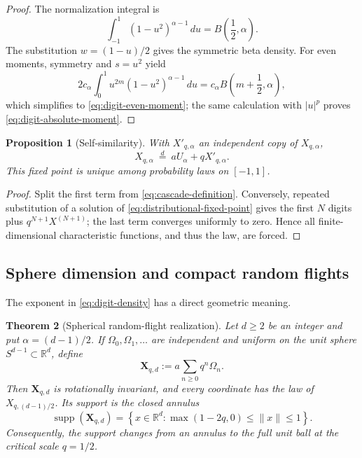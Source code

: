 \documentclass[11pt]{article}
\newtheorem{theorem}{Theorem}[section]
\newtheorem{proposition}[theorem]{Proposition}
\theoremstyle{definition}
\theoremstyle{remark}
\newcommand{\R}{\mathbb{R}}
\newcommand{\supp}{\operatorname{supp}}
\begin{document}
\begin{proof}
The normalization integral is
\[
 \int_{-1}^{1}(1-u^2)^{\alpha-1}\,du
 =B\left(\frac12,\alpha\right).
\]
The substitution \(w=(1-u)/2\) gives the symmetric beta density.  For even
moments, symmetry and \(s=u^2\) yield
\[
 2c_\alpha\int_0^1u^{2m}(1-u^2)^{\alpha-1}\,du
 =c_\alpha B\left(m+\frac12,\alpha\right),
\]
which simplifies to \eqref{eq:digit-even-moment}; the same calculation with
\(|u|^p\) proves \eqref{eq:digit-absolute-moment}.
\end{proof}

\begin{proposition}[Self-similarity]
\label{prop:self-similarity}
With \(X'_{q,\alpha}\) an independent copy of \(X_{q,\alpha}\),
\begin{equation}
 X_{q,\alpha}\ \overset d=\ aU_\alpha+qX'_{q,\alpha}.
 \label{eq:distributional-fixed-point}
\end{equation}
This fixed point is unique among probability laws on \([-1,1]\).
\end{proposition}

\begin{proof}
Split the first term from \eqref{eq:cascade-definition}.  Conversely, repeated
substitution of a solution of \eqref{eq:distributional-fixed-point} gives the
first \(N\) digits plus \(q^{N+1}X^{(N+1)}\); the last term converges uniformly
to zero.  Hence all finite-dimensional characteristic functions, and thus the
law, are forced.
\end{proof}

\subsection{Sphere dimension and compact random flights}

The exponent in \eqref{eq:digit-density} has a direct geometric meaning.

\begin{theorem}[Spherical random-flight realization]
\label{thm:spherical-realization}
Let \(d\ge2\) be an integer and put \(\alpha=(d-1)/2\).  If
\(\Omega_0,\Omega_1,\ldots\) are independent and uniform on the unit sphere
\(S^{d-1}\subset\R^d\), define
\begin{equation}
 \bm X_{q,d}:=a\sum_{n\ge0}q^n\Omega_n.
 \label{eq:vector-cascade}
\end{equation}
Then \(\bm X_{q,d}\) is rotationally invariant, and every coordinate has the
law of \(X_{q,(d-1)/2}\).  Its support is the closed annulus
\begin{equation}
 \supp(\bm X_{q,d})
 =\left\{x\in\R^d:
 \max(1-2q,0)\le\|x\|\le1\right\}.
 \label{eq:vector-support}
\end{equation}
Consequently, the support changes from an annulus to the full unit ball at the
critical scale \(q=1/2\).
\end{theorem}
\end{document}
